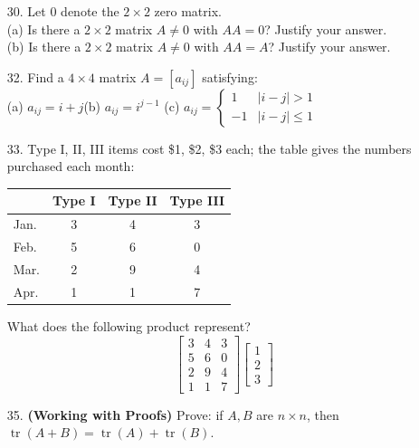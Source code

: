 \documentclass{article}
\theoremstyle{mystyle}
\begin{document}
\begin{enumerate}
    \item[30.] Let $0$ denote the $2\times2$ zero matrix.\\
    (a) Is there a $2\times2$ matrix $A\ne0$ with $AA=0$? Justify your answer.\\
    (b) Is there a $2\times2$ matrix $A\ne0$ with $AA=A$? Justify your answer.

    \item[32.] Find a $4\times4$ matrix $A=[a_{ij}]$ satisfying:\\
    (a) $a_{ij}=i+j$\qquad (b) $a_{ij}=i^{j-1}$\qquad
    (c) $a_{ij}=\begin{cases}1 & |i-j|>1\\ -1 & |i-j|\le1\end{cases}$

    \item[33.] Type I, II, III items cost \$1, \$2, \$3 each; the table gives the numbers purchased each month:\\
    \begin{center}
    \begin{tabular}{|l|c|c|c|}
    \hline
     & Type I & Type II & Type III\\
    \hline
    Jan. & 3 & 4 & 3\\
    \hline
    Feb. & 5 & 6 & 0\\
    \hline
    Mar. & 2 & 9 & 4\\
    \hline
    Apr. & 1 & 1 & 7\\
    \hline
    \end{tabular}
    \end{center}
    What does the following product represent?
    \[
    \begin{bmatrix}3&4&3\\5&6&0\\2&9&4\\1&1&7\end{bmatrix}\begin{bmatrix}1\\2\\3\end{bmatrix}
    \]

    \item[35.] \textbf{(Working with Proofs)} Prove: if $A,B$ are $n\times n$, then $\operatorname{tr}(A+B)=\operatorname{tr}(A)+\operatorname{tr}(B)$.
\end{enumerate}
\end{document}
